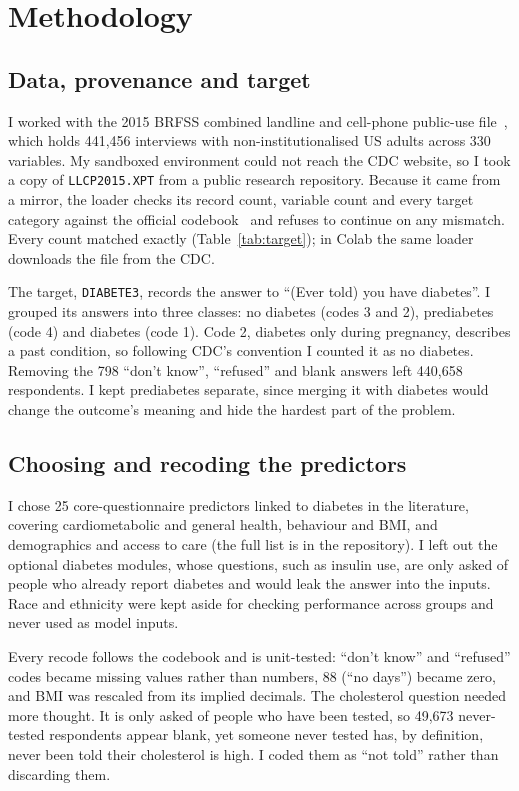 \section{Methodology}
\label{sec:method}

\subsection{Data, provenance and target}
I worked with the 2015 BRFSS combined landline and cell-phone public-use file~\cite{cdc2015data}, which holds 441,456 interviews with non-institutionalised US adults across 330 variables. My sandboxed environment could not reach the CDC website, so I took a copy of \texttt{LLCP2015.XPT} from a public research repository. Because it came from a mirror, the loader checks its record count, variable count and every target category against the official codebook~\cite{cdc2015codebook} and refuses to continue on any mismatch. Every count matched exactly (Table~\ref{tab:target}); in Colab the same loader downloads the file from the CDC.

The target, \texttt{DIABETE3}, records the answer to ``(Ever told) you have diabetes''. I grouped its answers into three classes: no diabetes (codes 3 and 2), prediabetes (code 4) and diabetes (code 1). Code 2, diabetes only during pregnancy, describes a past condition, so following CDC's convention I counted it as no diabetes. Removing the 798 ``don't know'', ``refused'' and blank answers left 440,658 respondents. I kept prediabetes separate, since merging it with diabetes would change the outcome's meaning and hide the hardest part of the problem.



\subsection{Choosing and recoding the predictors}
I chose 25 core-questionnaire predictors linked to diabetes in the literature, covering cardiometabolic and general health, behaviour and BMI, and demographics and access to care (the full list is in the repository). I left out the optional diabetes modules, whose questions, such as insulin use, are only asked of people who already report diabetes and would leak the answer into the inputs. Race and ethnicity were kept aside for checking performance across groups and never used as model inputs.

Every recode follows the codebook and is unit-tested: ``don't know'' and ``refused'' codes became missing values rather than numbers, 88 (``no days'') became zero, and BMI was rescaled from its implied decimals. The cholesterol question needed more thought. It is only asked of people who have been tested, so 49,673 never-tested respondents appear blank, yet someone never tested has, by definition, never been told their cholesterol is high. I coded them as ``not told'' rather than discarding them.


